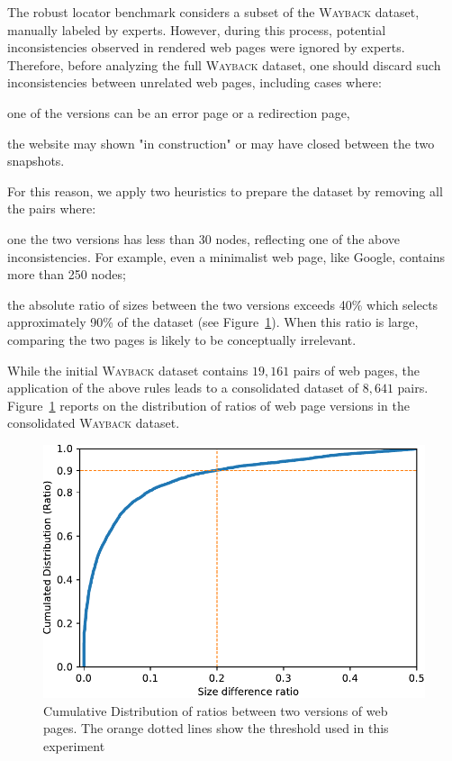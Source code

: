 \documentclass[preprint, 12pt]{elsarticle}
\begin{document}
\vspace{6pt}
The robust locator benchmark considers a subset of the \textsc{Wayback} dataset, manually labeled by experts.
However, during this process, potential inconsistencies observed in rendered web pages were ignored by experts.
% 
Therefore, before analyzing the full \textsc{Wayback} dataset, one should discard such inconsistencies between unrelated web pages, including cases where:
\begin{inparaenum}[\em (a)]
\item one of the versions can be an error page or a redirection page,
\item the website may shown "in construction" or may have closed between the two snapshots.
\end{inparaenum}  
% 
For this reason, we apply two heuristics to prepare the dataset by removing all the pairs where:
\begin{compactenum}
  \item one the two versions has less than 30 nodes, reflecting one of the above inconsistencies.
  For example, even a minimalist web page, like Google, contains more than 250 nodes;
  \item the absolute ratio of sizes between the two versions exceeds 40\% which
  selects approximately 90\% of the dataset (see
  Figure~\ref{fig:sizeDiffRatioDistribution}). When this ratio is large,
  comparing the two pages is likely to be conceptually irrelevant.
\end{compactenum}

While the initial \textsc{Wayback} dataset contains $19,161$ pairs of web pages, the application of the above rules leads to a consolidated dataset of $8,641$ pairs. %
Figure~\ref{fig:sizeDiffRatioDistribution} reports on the distribution of ratios of web page versions in the consolidated \textsc{Wayback} dataset.

\begin{figure}
  \centering
  \includegraphics[width=.8\linewidth]{sizeDiffRatioDistribution}
  \caption{Cumulative Distribution of ratios between two versions of web pages.
    The orange dotted lines show the threshold used in this experiment}
  \label{fig:sizeDiffRatioDistribution}
\end{figure}
\end{document}
